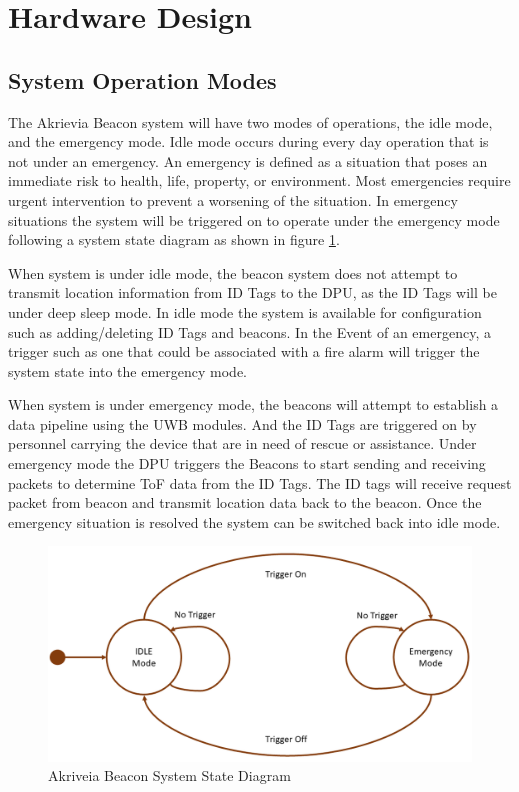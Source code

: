 

\setcounter{section}{3}
\section{Hardware Design}
\bigskip
\subsection{System Operation Modes}
\medskip
The Akrievia Beacon system will have two modes of operations, the idle mode, and the emergency mode. Idle mode occurs during every day operation that is not under an emergency. An emergency is defined as a situation that poses an immediate risk to health, life, property, or environment. Most emergencies require urgent intervention to prevent a worsening of the situation. In emergency situations the system will be triggered on to operate under the emergency mode following a system state diagram as shown in figure \ref{sys_state}.

\bigskip
When system is under idle mode, the beacon system does not attempt to transmit location information from ID Tags to the DPU, as the ID Tags will be under deep sleep mode. In idle mode the system is available for configuration such as adding/deleting ID Tags and beacons. In the Event of an emergency, a trigger such as one that could be associated with a fire alarm will trigger the system state into the emergency mode.

\bigskip
When system is under emergency mode, the beacons will attempt to establish a data pipeline using the UWB modules. And the ID Tags are triggered on by personnel carrying the device that are in need of rescue or assistance. Under emergency mode the DPU triggers the Beacons to start sending and receiving packets to determine ToF data from the ID Tags. The ID tags will receive request packet from beacon and transmit location data back to the beacon. Once the emergency situation is resolved the system can be switched back into idle mode.

\medskip
\begin{figure}[H]
\centering
    \includegraphics[scale=0.6]{./images/state_d.png}
    \caption{Akriveia Beacon System State Diagram}
    \label{sys_state}
\end{figure}
\medskip



